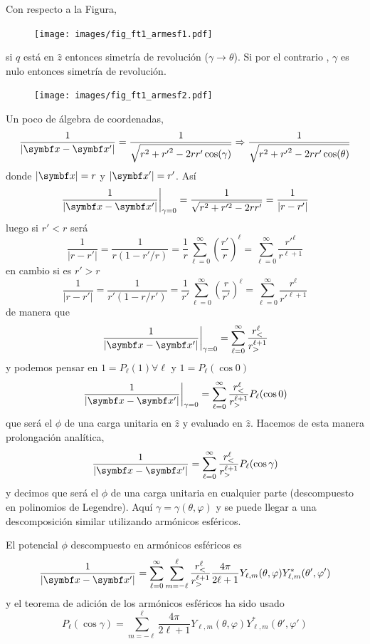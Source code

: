 \documentclass[10pt,oneside]{CBFT_book}
\begin{document}
Con respecto a la Figura, 

\begin{figure}[bht]
	\begin{center}
	\texttt{[image: images/fig\_ft1\_armesf1.pdf]}	 
	\end{center}
	\caption{}
\end{figure} 

si $q$ está en $\hat{z}$ entonces simetría de revolución ($\gamma \to \theta$). Si por el contrario ,
$\gamma $ es nulo entonces simetría de revolución.

\begin{figure}[tb]
	\begin{center}
	\texttt{[image: images/fig\_ft1\_armesf2.pdf]}	 
	\end{center}
	\caption{}
\end{figure} 

Un poco de álgebra de coordenadas,
\[
	\frac{1}{|\vb{x}-\vb{x}'|} = \frac{1}{\sqrt{r^2 + {r'}^2  - 2rr'\cos(\gamma)}} \Rightarrow
	\frac{1}{\sqrt{r^2 + {r'}^2  - 2rr'\cos(\theta)}}
\]
donde $|\vb{x}|=r$ y $|\vb{x}'|=r'$. Así
\[
	\left. \frac{1}{|\vb{x}-\vb{x}'|} \right|_{\gamma=0} = \frac{1}{\sqrt{r^2 + r'^2 -2rr'}}=
	\frac{1}{|r-r'|}
\]
luego si $r'<r$ será
\[
	\frac{1}{|r-r'|} = \frac{1}{r(1 - r'/r )} = \frac{1}{r} \sum_{\ell=0}^\infty \left(\frac{r'}{r}\right)^\ell = 
	\sum_{\ell=0}^\infty \frac{r'^\ell}{r^{\ell+1}}
\]
en cambio si es $r'>r$
\[
	\frac{1}{|r-r'|} = \frac{1}{r'(1 - r/r' )} = \frac{1}{r'} \sum_{\ell=0}^\infty \left(\frac{r}{r'}\right)^\ell = 
	\sum_{\ell=0}^\infty \frac{r^\ell}{r'^{\ell+1}}
\]
de manera que
\[
	\left. \frac{1}{|\vb{x}-\vb{x}'|} \right|_{\gamma=0} = \sum_{\ell=0}^\infty  \frac{r_<^\ell}{r_>^{\ell+1}}
\]
y podemos pensar en $1=P_\ell(1) \forall \ell$ y $1=P_\ell(\cos 0)$
\[
	\left. \frac{1}{|\vb{x}-\vb{x}'|} \right|_{\gamma=0} = \sum_{\ell=0}^\infty  \frac{r_<^\ell}{r_>^{\ell+1}}
	P_\ell(\cos 0)
\]
que será el $\phi$ de una carga unitaria en $\hat{z}$ y evaluado en $\hat{z}$.
Hacemos de esta manera prolongación analítica,
\[
	\frac{1}{|\vb{x}-\vb{x}'|}  = \sum_{\ell=0}^\infty  \frac{r_<^\ell}{r_>^{\ell+1}}
	P_\ell(\cos \gamma)
\]
y decimos que será el $\phi$ de una carga unitaria en cualquier parte (descompuesto en polinomios de Legendre).
Aquí $\gamma=\gamma(\theta,\varphi)$ y se puede llegar a una descomposición similar utilizando armónicos esféricos.

El potencial $\phi$ descompuesto en armónicos esféricos es
\[
	\frac{1}{|\vb{x}-\vb{x}'|}  = \sum_{\ell=0}^\infty \sum_{m=-\ell}^\ell \frac{r_<^\ell}{r_>^{\ell+1}}
	\frac{4\pi}{2\ell+1} Y_{\ell,m}(\theta,\varphi) Y_{\ell,m}^*(\theta',\varphi')
\]
y el teorema de adición de los armónicos esféricos ha sido usado
\[
	P_\ell(\cos \gamma) = \sum_{m=-\ell}^\ell \frac{4\pi}{2\ell+1} Y_{\ell,m}(\theta,\varphi) 
	Y_{\ell,m}^*(\theta',\varphi')
\]
\end{document}
